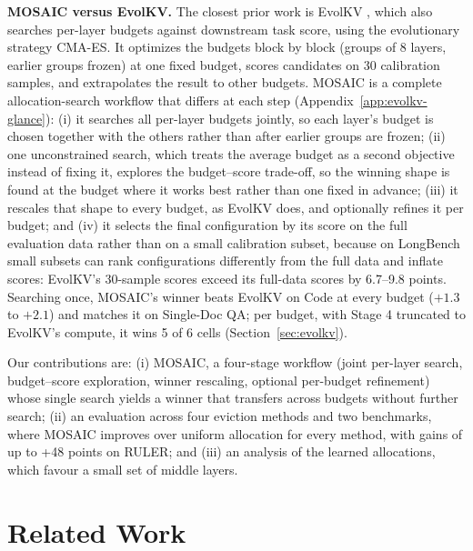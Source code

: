 \documentclass[11pt]{article}
\begin{document}
\textbf{MOSAIC versus EvolKV.}\label{sec:intro-evolkv} The closest prior work is EvolKV \citep{yu2025evolkv}, which also searches per-layer budgets against downstream task score, using the evolutionary strategy CMA-ES. It optimizes the budgets block by block (groups of 8 layers, earlier groups frozen) at one fixed budget, scores candidates on 30 calibration samples, and extrapolates the result to other budgets. MOSAIC is a complete allocation-search workflow that differs at each step (Appendix~\ref{app:evolkv-glance}): (i) it searches all per-layer budgets jointly, so each layer's budget is chosen together with the others rather than after earlier groups are frozen; (ii) one unconstrained search, which treats the average budget as a second objective instead of fixing it, explores the budget--score trade-off, so the winning shape is found at the budget where it works best rather than one fixed in advance; (iii) it rescales that shape to every budget, as EvolKV does, and optionally refines it per budget; and (iv) it selects the final configuration by its score on the full evaluation data rather than on a small calibration subset, because on LongBench small subsets can rank configurations differently from the full data and inflate scores: EvolKV's 30-sample scores exceed its full-data scores by 6.7--9.8 points. Searching once, MOSAIC's winner beats EvolKV on Code at every budget ($+1.3$ to $+2.1$) and matches it on Single-Doc QA; per budget, with Stage 4 truncated to EvolKV's compute, it wins 5 of 6 cells (Section~\ref{sec:evolkv}).

Our contributions are: (i) MOSAIC, a four-stage workflow (joint per-layer search, budget--score exploration, winner rescaling, optional per-budget refinement) whose single search yields a winner that transfers across budgets without further search; (ii) an evaluation across four eviction methods and two benchmarks, where MOSAIC improves over uniform allocation for every method, with gains of up to +48 points on RULER; and (iii) an analysis of the learned allocations, which favour a small set of middle layers.

\section{Related Work}
\end{document}

